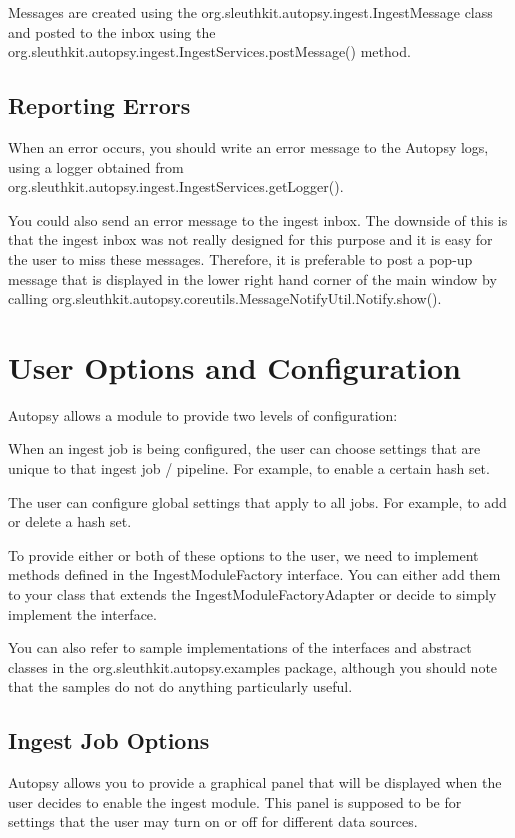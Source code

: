 Messages are created using the org.\+sleuthkit.\+autopsy.\+ingest.\+Ingest\+Message class and posted to the inbox using the org.\+sleuthkit.\+autopsy.\+ingest.\+Ingest\+Services.\+post\+Message() method.\hypertarget{mod_ingest_page_ingest_modules_making_results_error}{}\subsection{Reporting Errors}\label{mod_ingest_page_ingest_modules_making_results_error}
When an error occurs, you should write an error message to the Autopsy logs, using a logger obtained from org.\+sleuthkit.\+autopsy.\+ingest.\+Ingest\+Services.\+get\+Logger().

You could also send an error message to the ingest inbox. The downside of this is that the ingest inbox was not really designed for this purpose and it is easy for the user to miss these messages. Therefore, it is preferable to post a pop-\/up message that is displayed in the lower right hand corner of the main window by calling org.\+sleuthkit.\+autopsy.\+coreutils.\+Message\+Notify\+Util.\+Notify.\+show().\hypertarget{mod_ingest_page_ingest_modules_making_options}{}\section{User Options and Configuration}\label{mod_ingest_page_ingest_modules_making_options}
Autopsy allows a module to provide two levels of configuration\+:
\begin{DoxyItemize}
\item When an ingest job is being configured, the user can choose settings that are unique to that ingest job / pipeline. For example, to enable a certain hash set.
\item The user can configure global settings that apply to all jobs. For example, to add or delete a hash set.
\end{DoxyItemize}

To provide either or both of these options to the user, we need to implement methods defined in the Ingest\+Module\+Factory interface. You can either add them to your class that extends the Ingest\+Module\+Factory\+Adapter or decide to simply implement the interface.

You can also refer to sample implementations of the interfaces and abstract classes in the org.\+sleuthkit.\+autopsy.\+examples package, although you should note that the samples do not do anything particularly useful.\hypertarget{mod_ingest_page_ingest_modules_making_options_ingest}{}\subsection{Ingest Job Options}\label{mod_ingest_page_ingest_modules_making_options_ingest}
Autopsy allows you to provide a graphical panel that will be displayed when the user decides to enable the ingest module. This panel is supposed to be for settings that the user may turn on or off for different data sources.

